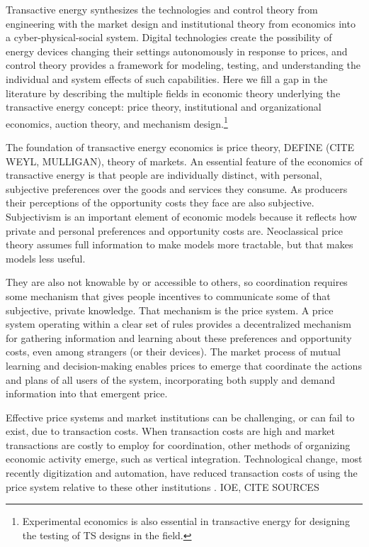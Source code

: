 Transactive energy synthesizes the technologies and control theory from engineering with the market design and institutional theory from economics into a cyber-physical-social system. Digital technologies create the possibility of energy devices changing their settings autonomously in response to prices, and control theory provides a framework for modeling, testing, and understanding the individual and system effects of such capabilities. Here we fill a gap in the literature by describing the multiple fields in economic theory underlying the transactive energy concept: price theory, institutional and organizational economics, auction theory, and mechanism design.\footnote{Experimental economics is also essential in transactive energy for designing the testing of TS designs in the field.}

The foundation of transactive energy economics is price theory, DEFINE (CITE WEYL, MULLIGAN), theory of markets. An essential feature of the economics of transactive energy is that people are individually distinct, with personal, subjective preferences over the goods and services they consume. As producers their perceptions of the opportunity costs they face are also subjective. Subjectivism is an important element of economic models because it reflects how private and personal preferences and opportunity costs are. Neoclassical price theory assumes full information to make models more tractable, but that makes models less useful.

They are also not knowable by or accessible to others, so coordination requires some mechanism that gives people incentives to communicate some of that subjective, private knowledge. That mechanism is the price system. A price system operating within a clear set of rules provides a decentralized mechanism for gathering information and learning about these preferences and opportunity costs, even among strangers (or their devices). The market process of mutual learning and decision-making enables prices to emerge that coordinate the actions and plans of all users of the system, incorporating both supply and demand information into that emergent price.

Effective price systems and market institutions can be challenging, or can fail to exist, due to transaction costs. When transaction costs are high and market transactions are costly to employ for coordination, other methods of organizing economic activity emerge, such as vertical integration. Technological change, most recently digitization and automation, have reduced transaction costs of using the price system relative to these other institutions \citep{kiesling_2016}. IOE, CITE SOURCES

